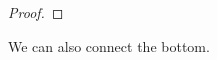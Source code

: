\documentclass[a4paper, UKenglish]{lipics-v2018}
\begin{document}
\begin{proof}



\end{proof}














We can also connect the bottom.
\end{document}
